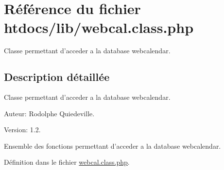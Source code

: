 \hypertarget{webcal_8class_8php}{
\section{R\'{e}f\'{e}rence du fichier htdocs/lib/webcal.class.php}
\label{webcal_8class_8php}
}
Classe permettant d'acceder a la database webcalendar.  




\subsection{Description d\'{e}taill\'{e}e}
Classe permettant d'acceder a la database webcalendar. 

\begin{Desc}
\item[Auteur:]Rodolphe Quiedeville. \end{Desc}
\begin{Desc}
\item[Version:]1.2.\end{Desc}
Ensemble des fonctions permettant d'acceder a la database webcalendar.

D\'{e}finition dans le fichier \hyperlink{webcal_8class_8php-source}{webcal.class.php}.